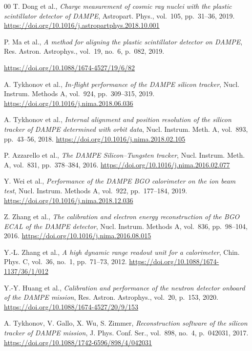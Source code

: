 \documentclass[preprint,12pt]{elsarticle}
\newcommand{\doi}[1]{\url{https://doi.org/#1}}
\begin{document}
\begin{thebibliography}{00}
  T. Dong et al.,
  \textit{Charge measurement of cosmic ray nuclei with the plastic scintillator detector of DAMPE},
  Astropart. Phys., vol.~105, pp.~31--36, 2019.
  \doi{10.1016/j.astropartphys.2018.10.001}

  P. Ma et al.,
  \textit{A method for aligning the plastic scintillator detector on DAMPE},
  Res. Astron. Astrophys., vol.~19, no.~6, p.~082, 2019.

  \doi{10.1088/1674-4527/19/6/82}

  A. Tykhonov et al.,
  \textit{In-flight performance of the DAMPE silicon tracker},
  Nucl. Instrum. Methods A, vol.~924, pp.~309--315, 2019.
  \doi{10.1016/j.nima.2018.06.036}

  A. Tykhonov et al.,
  \textit{Internal alignment and position resolution of the silicon tracker of DAMPE determined with orbit data},
  Nucl. Instrum. Meth. A, vol.~893, pp.~43--56, 2018.
  \doi{10.1016/j.nima.2018.02.105}

  P. Azzarello et al.,
  \textit{The DAMPE Silicon--Tungsten tracker},
  Nucl. Instrum. Meth. A, vol.~831, pp.~378--384, 2016.
  \doi{10.1016/j.nima.2016.02.077}

  Y. Wei et al.,
  \textit{Performance of the DAMPE BGO calorimeter on the ion beam test},
  Nucl. Instrum. Methods A, vol.~922, pp.~177--184, 2019.
  \doi{10.1016/j.nima.2018.12.036}

  Z. Zhang et al.,
  \textit{The calibration and electron energy reconstruction of the BGO ECAL of the DAMPE detector},
  Nucl. Instrum. Methods A, vol.~836, pp.~98--104, 2016.
  \doi{10.1016/j.nima.2016.08.015}

  Y.-L. Zhang et al.,
  \textit{A high dynamic range readout unit for a calorimeter},
  Chin. Phys. C, vol.~36, no.~1, pp.~71--73, 2012.
  \doi{10.1088/1674-1137/36/1/012}

  Y.-Y. Huang et al.,
  \textit{Calibration and performance of the neutron detector onboard of the DAMPE mission},
  Res. Astron. Astrophys., vol.~20, p.~153, 2020.
  \doi{10.1088/1674-4527/20/9/153}

  A. Tykhonov, V. Gallo, X. Wu, S. Zimmer,
  \textit{Reconstruction software of the silicon tracker of DAMPE mission},
  J. Phys. Conf. Ser., vol.~898, no.~4, p.~042031, 2017.
  \doi{10.1088/1742-6596/898/4/042031}


\end{thebibliography}
\end{document}
